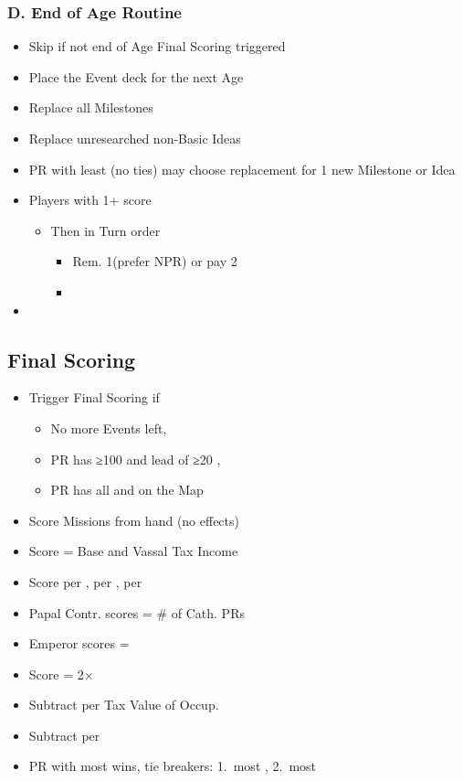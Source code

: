 \documentclass[10pt]{article}
\begin{document}
\subsubsection*{D. End of Age Routine}
\begin{itemize}
	\item Skip if not end of Age  Final Scoring triggered
	\item Place the Event deck for the next Age
	\item Replace all Milestones
	\item Replace unresearched non-Basic Ideas
	\item PR with least \prestige (no ties) may choose replacement for 1 new Milestone or Idea
	\item Players with 1+ \marriage score 
	\begin{itemize}
		\item Then in Turn order
		\begin{itemize}
			\item Rem. 1\marriage (prefer NPR) or pay 2\diplopower
			\item {}
			\end{itemize}
	\end{itemize}
	\item {}
\end{itemize}

\subsection*{Final Scoring}
\begin{itemize}
	\item Trigger Final Scoring  if
	\begin{itemize}
		\item No more Events left, 
		\item PR has ≥100 \prestige and lead of ≥20 \prestige, 
		\item PR has all \towns and \vassals on the Map
	\end{itemize}
	\item Score Missions from hand (no effects)
	\item Score \prestige = Base and Vassal Tax Income
	\item Score  per \core,  per \marriage,  per \alliance
	\item Papal Contr. scores \prestige = \# of Cath. PRs
	\item Emperor scores \prestige = \authority
	\item Score \prestige = 2× \stability
	\item Subtract  per Tax Value of Occup. \towns
	\item Subtract  per \interest
	\item PR with most \prestige wins, tie breakers: 1.~most \monarchpower, 2.~most \ducats%
\end{itemize}
\end{document}
